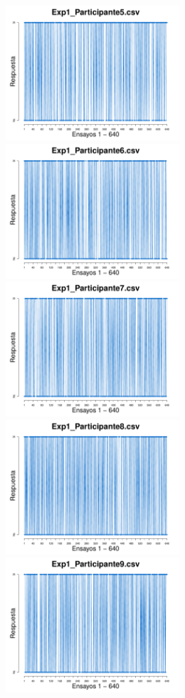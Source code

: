 \documentclass[a4paper ]{article}
\begin{document}
\begin{figure}[th]
\includegraphics[width=9cm, height=5cm]{Figures/Response_Exp1_P5} \includegraphics[width=9cm, height=5cm]{Figures/Response_Exp1_P6}
\includegraphics[width=9cm, height=5cm]{Figures/Response_Exp1_P7} \includegraphics[width=9cm, height=5cm]{Figures/Response_Exp1_P8} 
\includegraphics[width=9cm, height=5cm]{Figures/Response_Exp1_P9}
\end{figure}
\end{document}
